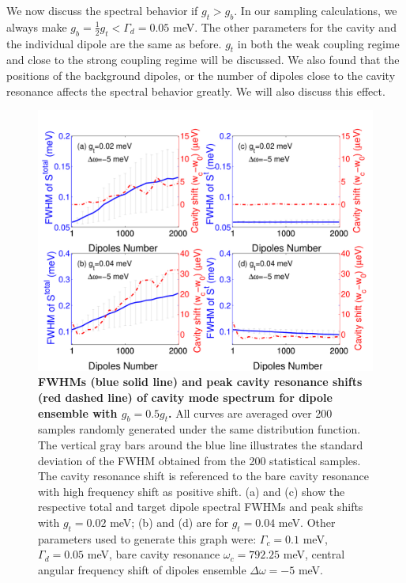 \vspace{\baselineskip}
We now discuss the spectral behavior if $g_t>g_b$. In our sampling calculations, we always make $g_b=\frac{1}{2}g_t<\Gamma_d=0.05$ meV. The other parameters for the cavity and the individual dipole are the same as before. $g_t$ in both the weak coupling regime and close to the strong coupling regime will be discussed. We also found that the positions of the background dipoles, or the number of dipoles close to the cavity resonance affects the spectral behavior greatly. We will also discuss this effect.

\begin{figure}[H]%
\centering
\begin{center}
\includegraphics[width=12cm]{./Figs/fwhm_wdrand5s20_gt0dot2-0dot4_qd2000_stat200}
\end{center}
\caption[Spectral modification of a cavity with a target dipole and an ensemble.]{\textbf{  FWHMs (blue solid line) and peak cavity resonance shifts (red dashed line) of cavity mode spectrum for dipole ensemble with $g_b=0.5g_t$.} All curves are averaged over 200 samples randomly generated under the same distribution function. The vertical gray bars around the blue line illustrates the standard deviation of the FWHM obtained from the 200 statistical samples. The cavity resonance shift is referenced to the bare cavity resonance with high frequency shift as positive shift. (a) and (c) show the respective total and target dipole spectral FWHMs and peak shifts with $g_t=0.02$ meV; (b) and (d) are for $g_t=0.04$ meV. Other parameters used to generate this graph were: $\Gamma_c=0.1$ meV, $\Gamma_{d}=0.05$ meV, bare cavity resonance $\omega_c=792.25$ meV, central angular frequency shift of dipoles ensemble $\Delta\omega=-5$ meV. }
\label{fwhm_wdrand5s20_gt0.2-0.4_qd2000_stat200}
\end{figure}

